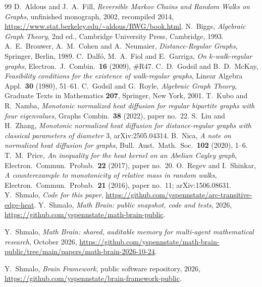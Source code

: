 \documentclass[11pt]{amsart}
\theoremstyle{definition}
\theoremstyle{remark}
\begin{document}
\begin{thebibliography}{99}
 D.~Aldous and J.~A.~Fill, \emph{Reversible Markov Chains and Random Walks on Graphs}, unfinished monograph, 2002, recompiled 2014, \url{https://www.stat.berkeley.edu/~aldous/RWG/book.html}.
 N.~Biggs, \emph{Algebraic Graph Theory}, 2nd ed., Cambridge University Press, Cambridge, 1993.
 A.~E.~Brouwer, A.~M.~Cohen and A.~Neumaier, \emph{Distance-Regular Graphs}, Springer, Berlin, 1989.
 C.~Dalf\'o, M.~A.~Fiol and E.~Garriga, \emph{On $k$-walk-regular graphs}, Electron.\ J.\ Combin.\ \textbf{16} (2009), \#R47.
 C.~D.~Godsil and B.~D.~McKay, \emph{Feasibility conditions for the existence of walk-regular graphs}, Linear Algebra Appl.\ \textbf{30} (1980), 51--61.
 C.~Godsil and G.~Royle, \emph{Algebraic Graph Theory}, Graduate Texts in Mathematics \textbf{207}, Springer, New York, 2001.
 T.~Kubo and R.~Namba, \emph{Monotonic normalized heat diffusion for regular bipartite graphs with four eigenvalues}, Graphs Combin.\ \textbf{38} (2022), paper no.~22.
 S.~Liu and H.~Zhang, \emph{Monotonic normalized heat diffusion for distance-regular graphs with classical parameters of diameter $3$}, arXiv:2505.04314.
 B.~Nica, \emph{A note on normalized heat diffusion for graphs}, Bull.\ Aust.\ Math.\ Soc.\ \textbf{102} (2020), 1--6.
 T.~M.~Price, \emph{An inequality for the heat kernel on an Abelian Cayley graph}, Electron.\ Commun.\ Probab.\ \textbf{22} (2017), paper no.~20.
 O.~Regev and I.~Shinkar, \emph{A counterexample to monotonicity of relative mass in random walks}, Electron.\ Commun.\ Probab.\ \textbf{21} (2016), paper no.~11; arXiv:1506.08631.
 Y.~Shmalo, \emph{Code for this paper}, \url{https://github.com/yspennstate/arc-transitive-edge-heat}.
 Y.~Shmalo, \emph{Math Brain: public snapshot, code and tests}, 2026, \url{https://github.com/yspennstate/math-brain-public}.

 Y.~Shmalo, \emph{Math Brain: shared, auditable memory for multi-agent mathematical research}, October 2026, \url{https://github.com/yspennstate/math-brain-public/tree/main/papers/math-brain-2026-10-24}.

 Y.~Shmalo, \emph{Brain Framework}, public software repository, 2026, \url{https://github.com/yspennstate/brain-framework-public}.

\end{thebibliography}
\end{document}
